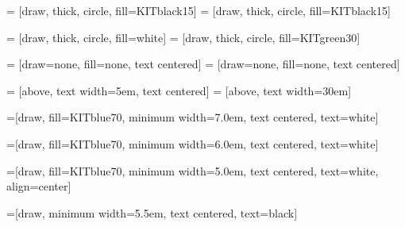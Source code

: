 








 = [draw, thick, circle, fill=KITblack15]
 = [draw, thick, circle, fill=KITblack15]

 = [draw, thick, circle, fill=white]
 = [draw, thick, circle, fill=KITgreen30]

 = [draw=none, fill=none, text centered]
 = [draw=none, fill=none, text centered]

 = [above, text width=5em, text centered]
 = [above, text width=30em]

=[draw, fill=KITblue70, minimum width=7.0em, text centered, 
	text=white]

=[draw, fill=KITblue70, minimum width=6.0em, text centered, 
	text=white]

=[draw, fill=KITblue70, minimum width=5.0em, text centered, 
	text=white, align=center]

=[draw, minimum width=5.5em, text centered, 
	text=black]

